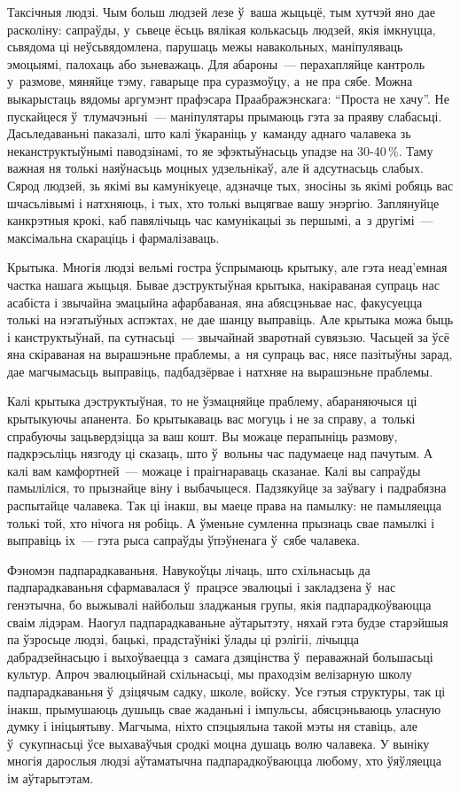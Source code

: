 Таксічныя людзі. Чым больш людзей лезе ў~ваша жыцьцё, тым хутчэй яно дае расколіну: сапраўды, у~сьвеце ёсьць вялікая колькасьць людзей, якія імкнуцца, сьвядома ці неўсьвядомлена, парушаць межы навакольных, маніпуляваць эмоцыямі, палохаць або зьневажаць. Для абароны~--- перахапляйце кантроль у~размове, мяняйце тэму, гаварыце пра суразмоўцу, а~не пра сябе. Можна выкарыстаць вядомы аргумэнт прафэсара Праабражэнскага: ``Проста не хачу''. Не пускайцеся ў~тлумачэньні~--- маніпулятары прымаюць гэта за праяву слабасьці. Дасьледаваньні паказалі, што калі ўкараніць у~каманду аднаго чалавека зь неканструктыўнымі паводзінамі, то яе эфэктыўнасьць упадзе на 30-40\,\%. Таму важная ня толькі наяўнасьць моцных удзельнікаў, але й адсутнасьць слабых. Сярод людзей, зь якімі вы камунікуеце, адзначце тых, зносіны зь якімі робяць вас шчасьлівымі і натхняюць, і тых, хто толькі выцягвае вашу энэргію. Заплянуйце канкрэтныя крокі, каб павялічыць час камунікацыі зь першымі, а~з другімі~--- максімальна скараціць і фармалізаваць.

Крытыка. Многія людзі вельмі гостра ўспрымаюць крытыку, але гэта неад'емная частка нашага жыцьця. Бывае дэструктыўная крытыка, накіраваная супраць нас асабіста і звычайна эмацыйна афарбаваная, яна абясцэньвае нас, факусуецца толькі на нэгатыўных аспэктах, не дае шанцу выправіць. Але крытыка можа быць і канструктыўнай, па сутнасьці~--- звычайнай зваротнай сувязьзю. Часьцей за ўсё яна скіраваная на вырашэньне праблемы, а~ня супраць вас, нясе пазітыўны зарад, дае магчымасьць выправіць, падбадзёрвае і натхняе на вырашэньне праблемы.

Калі крытыка дэструктыўная, то не ўзмацняйце праблему, абараняючыся ці крытыкуючы апанента. Бо крытыкаваць вас могуць і не за справу, а~толькі спрабуючы зацьвердзіцца за ваш кошт. Вы можаце перапыніць размову, падкрэсьліць нязгоду ці сказаць, што ў~вольны час падумаеце над пачутым. А калі вам камфортней~--- можаце і праігнараваць сказанае. Калі вы сапраўды памыліліся, то прызнайце віну і выбачыцеся. Падзякуйце за заўвагу і падрабязна распытайце чалавека. Так ці інакш, вы маеце права на памылку: не памыляецца толькі той, хто нічога ня робіць. А ўменьне сумленна прызнаць свае памылкі і выправіць іх~--- гэта рыса сапраўды ўпэўненага ў~сябе чалавека.

Фэномэн падпарадкаваньня. Навукоўцы лічаць, што схільнасьць да падпарадкаваньня сфармавалася ў~працэсе эвалюцыі і закладзена ў~нас генэтычна, бо выжывалі найбольш зладжаныя групы, якія падпарадкоўваюцца сваім лідэрам. Наогул падпарадкаваньне аўтарытэту, няхай гэта будзе старэйшыя па ўзросьце людзі, бацькі, прадстаўнікі ўлады ці рэлігіі, лічыцца дабрадзейнасьцю і выхоўваецца з~самага дзяцінства ў~пераважнай большасьці культур. Апроч эвалюцыйнай схільнасьці, мы праходзім велізарную школу падпарадкаваньня ў~дзіцячым садку, школе, войску. Усе гэтыя структуры, так ці інакш, прымушаюць душыць свае жаданьні і імпульсы, абясцэньваюць уласную думку і ініцыятыву. Магчыма, ніхто спэцыяльна такой мэты ня ставіць, але ў~сукупнасьці ўсе выхаваўчыя сродкі моцна душаць волю чалавека. У выніку многія дарослыя людзі аўтаматычна падпарадкоўваюцца любому, хто ўяўляецца ім аўтарытэтам.

